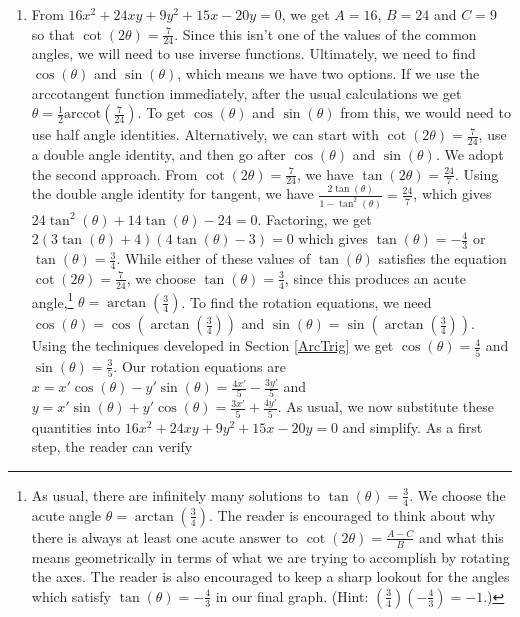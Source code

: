 \begin{ex}
\begin{enumerate}
\item  From $16x^2+24xy+9y^2 +15x-20y = 0$, we get $A = 16$, $B=24$ and $C = 9$ so that $\cot(2\theta) = \frac{7}{24}$.  Since this isn't one of the values of the common angles, we will need to use inverse functions. Ultimately, we need to find $\cos(\theta)$ and $\sin(\theta)$, which means we have two options. If we use the arccotangent function immediately, after the usual calculations we get $\theta = \frac{1}{2} \text{arccot}\left(\frac{7}{24}\right)$.  To get $\cos(\theta)$ and $\sin(\theta)$ from this, we would need to use half angle identities.  Alternatively, we can start with $\cot(2\theta) = \frac{7}{24}$, use a double angle identity, and then go after $\cos(\theta)$ and $\sin(\theta)$.  We adopt the second approach. From $\cot(2\theta) = \frac{7}{24}$, we have $\tan(2\theta) = \frac{24}{7}$.  Using the double angle identity for tangent, we have $\frac{2\tan(\theta)}{1-\tan^{2}(\theta)} = \frac{24}{7}$, which gives $24 \tan^{2}(\theta) + 14 \tan(\theta) - 24=0$.  Factoring, we get $2(3\tan(\theta)+4)(4\tan(\theta)-3) = 0$ which gives $\tan(\theta) = -\frac{4}{3}$ or $\tan(\theta) = \frac{3}{4}$.  While either of these values of $\tan(\theta)$ satisfies the equation $\cot(2\theta) = \frac{7}{24}$, we choose $\tan(\theta) = \frac{3}{4}$, since this produces an acute angle,\footnote{As usual, there are infinitely many solutions to $\tan(\theta) = \frac{3}{4}$.  We choose the acute angle  $\theta=\arctan\left(\frac{3}{4}\right)$. The reader is encouraged to think about why there is always at least one acute answer to $\cot(2\theta) = \frac{A-C}{B}$ and what this means geometrically in terms of what we are trying to accomplish by rotating the axes.  The reader is also encouraged to keep a sharp lookout for the angles which satisfy $\tan(\theta) = -\frac{4}{3}$ in our final graph.  (Hint:  $\left(\frac{3}{4}\right) \left(-\frac{4}{3}\right) = -1$.)}  $\theta = \arctan\left(\frac{3}{4}\right)$.  To find the rotation equations, we need $\cos(\theta) = \cos\left(\arctan\left(\frac{3}{4}\right)\right)$ and $\sin(\theta) = \sin\left(\arctan\left(\frac{3}{4}\right)\right)$. Using the techniques developed in Section \ref{ArcTrig} we get $\cos(\theta) = \frac{4}{5}$ and $\sin(\theta) = \frac{3}{5}$. Our rotation equations are $x = x' \cos(\theta) - y' \sin(\theta) = \frac{4x'}{5} - \frac{3y'}{5}$ and $y = x' \sin(\theta) + y'\cos(\theta) = \frac{3x'}{5} + \frac{4y'}{5}$.  As usual, we now substitute these quantities into $16x^2+24xy+9y^2 +15x-20y = 0$ and simplify.  As a first step, the reader can verify



\end{enumerate}
\end{ex}
